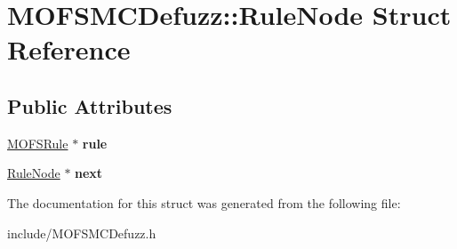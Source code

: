 \hypertarget{structMOFSMCDefuzz_1_1RuleNode}{\section{M\-O\-F\-S\-M\-C\-Defuzz\-:\-:Rule\-Node Struct Reference}
\label{structMOFSMCDefuzz_1_1RuleNode}
}
\subsection*{Public Attributes}
\begin{DoxyCompactItemize}
\item 
\hypertarget{structMOFSMCDefuzz_1_1RuleNode_a5ad3d1659f0ae693f5ddaf8c27414605}{\hyperlink{classMOFSRule}{M\-O\-F\-S\-Rule} $\ast$ {\bfseries rule}}\label{structMOFSMCDefuzz_1_1RuleNode_a5ad3d1659f0ae693f5ddaf8c27414605}

\item 
\hypertarget{structMOFSMCDefuzz_1_1RuleNode_a4b90a29c83048a3b2618d5b27d42d30d}{\hyperlink{structMOFSMCDefuzz_1_1RuleNode}{Rule\-Node} $\ast$ {\bfseries next}}\label{structMOFSMCDefuzz_1_1RuleNode_a4b90a29c83048a3b2618d5b27d42d30d}

\end{DoxyCompactItemize}


The documentation for this struct was generated from the following file\-:\begin{DoxyCompactItemize}
\item 
include/M\-O\-F\-S\-M\-C\-Defuzz.\-h\end{DoxyCompactItemize}
